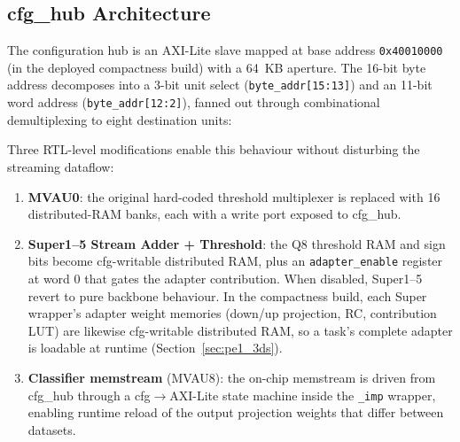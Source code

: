 \documentclass[12pt, a4paper]{report}
\numberwithin{equation}{chapter}
\numberwithin{figure}{chapter}
\numberwithin{table}{chapter}
\numberwithin{algorithm}{chapter}
\begin{document}
\subsection{cfg\_hub Architecture}

The configuration hub is an AXI-Lite slave mapped at base address \texttt{0x40010000} (in the deployed compactness build) with a 64~KB aperture. The 16-bit byte address decomposes into a 3-bit unit select (\texttt{byte\_addr[15:13]}) and an 11-bit word address (\texttt{byte\_addr[12:2]}), fanned out through combinational demultiplexing to eight destination units:

\begin{table}[H]
\centering
\caption{cfg\_hub Address Map (Base 0x40010000, 64~KB)}
\label{tab:cfg_hub_map}
\end{table}

Three RTL-level modifications enable this behaviour without disturbing the streaming dataflow:
\begin{enumerate}
    \item \textbf{MVAU0}: the original hard-coded threshold multiplexer is replaced with 16 distributed-RAM banks, each with a write port exposed to cfg\_hub.
    \item \textbf{Super1--5 Stream Adder + Threshold}: the Q8 threshold RAM and sign bits become cfg-writable distributed RAM, plus an \texttt{adapter\_enable} register at word 0 that gates the adapter contribution. When disabled, Super1--5 revert to pure backbone behaviour. In the compactness build, each Super wrapper's adapter weight memories (down/up projection, RC, contribution LUT) are likewise cfg-writable distributed RAM, so a task's complete adapter is loadable at runtime (Section~\ref{sec:pe1_3ds}).
    \item \textbf{Classifier memstream} (MVAU8): the on-chip memstream is driven from cfg\_hub through a cfg$\to$AXI-Lite state machine inside the \texttt{\_imp} wrapper, enabling runtime reload of the output projection weights that differ between datasets.
\end{enumerate}
\end{document}
